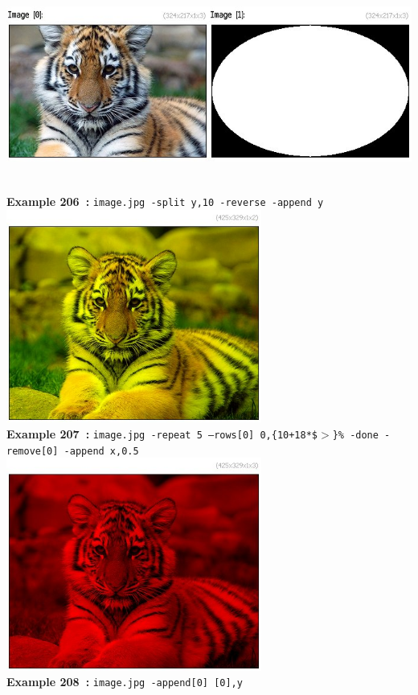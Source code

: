 \documentclass[a4paper,11pt,twoside]{book}
\begin{document}
\begin{center}\includegraphics[keepaspectratio=true,height=7cm,width=\textwidth]{img/gmic_def206.jpg}\\
{\footnotesize \textbf{Example 206~:} \texttt{image.jpg -split y,10 -reverse -append y}}
\\\includegraphics[keepaspectratio=true,height=7cm,width=\textwidth]{img/gmic_def207.jpg}\\
{\footnotesize \textbf{Example 207~:} \texttt{image.jpg -repeat 5 --rows[0] 0,\{10+18*\$$>$\}\% -done -remove[0] -append x,0.5}}
\\\includegraphics[keepaspectratio=true,height=7cm,width=\textwidth]{img/gmic_def208.jpg}\\
{\footnotesize \textbf{Example 208~:} \texttt{image.jpg -append[0] [0],y}}
\end{center}
\end{document}
